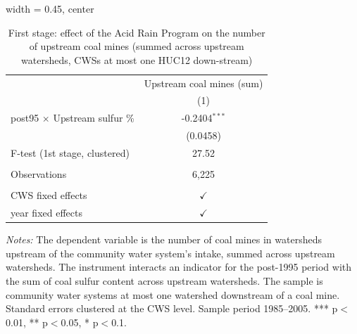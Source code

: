 
\begin{table}[htbp]
   
   \caption{\label{tab:fs_dwnstrm_minevio_ivsum_binvio} First stage: effect of the Acid Rain Program on the number of upstream coal mines (summed across upstream watersheds, CWSs at most one HUC12 down-stream)}
   \bigskip
   
   \centering
   
   \begin{adjustbox}{width = 0.45\textwidth, center}
      
      
      \begin{tabular}{lc}
         \toprule
         
                                              & Upstream coal mines (sum)\\  
         
                                              & (1)\\  
         
         \midrule 
         post95 $\times$ Upstream sulfur \%   & -0.2404$^{***}$\\   
                                              & (0.0458)\\   
         
         F-test (1st stage, clustered)        & 27.52\\  
         
          \\
         
         Observations                         & 6,225\\  
         
          \\
         
         CWS fixed effects                    & $\checkmark$\\   
         year fixed effects                   & $\checkmark$\\   
         
         \bottomrule
         
      \end{tabular}
      
      
      
   \end{adjustbox}
      {\tiny\linespread{1}\selectfont \par \raggedright 
   \textit{Notes:} The dependent variable is the number of coal mines in watersheds upstream of the community water system's intake, summed across upstream watersheds. The instrument interacts an indicator for the post-1995 period with the sum of coal sulfur content across upstream watersheds. The sample is community water systems at most one watershed downstream of a coal mine. Standard errors clustered at the CWS level. Sample period 1985--2005. *** p$<$0.01, ** p$<$0.05, * p$<$0.1.}
   
\end{table}


